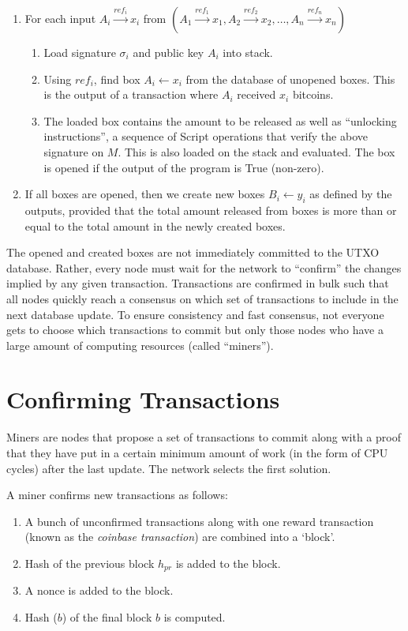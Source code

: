 \documentclass[]{report}   %
\newcommand{\sr}{\stackrel}
\newcommand{\ra}{\rightarrow}
\newcommand{\la}{\leftarrow}
\begin{document}
\begin{enumerate}
  \item	For each input $A_i\sr{ref_i}{\ra}x_i$ from $(A_1\sr{ref_1}{\ra}x_1, A_2\sr{ref_2}{\ra}x_2, \ldots, A_n\sr{ref_n}{\ra}x_n)$
	
	\begin{enumerate}
		\item Load signature $\sigma_i$ and public key $A_i$ into stack. 
		\item Using $ref_i$, find box $A_{i}\la x_i$ from the database of unopened boxes. This is the output of a transaction where $A_i$ received $x_i$ bitcoins. 
		\item The loaded box contains the amount to be released as well as ``unlocking instructions'', a sequence of Script operations that verify the above signature on $M$. This is also loaded on the stack and evaluated. The box is opened if the output of the program is True (non-zero).
	\end{enumerate}
	\item If all boxes are opened, then we create new boxes $B_i\la y_i$ as defined by the outputs, provided that the total amount released from boxes is more than or equal to the total amount in the newly created boxes. 
\end{enumerate}

The opened and created boxes are not immediately committed to the UTXO database. Rather, every node must wait for the network to ``confirm'' the changes implied by any given transaction.  
Transactions are confirmed in bulk such that all nodes quickly reach a consensus on which set of transactions to include in the next database update. 
To ensure consistency and fast consensus, not everyone gets to choose which transactions to commit but only those nodes who have a large amount of computing resources (called ``miners'').

 
\section{Confirming Transactions}
\label{sec:verify}
Miners are nodes that propose a set of transactions to commit along with a proof that they have put in a certain minimum amount of work (in the form of CPU cycles) after the last update. The network selects the first solution. 

A miner confirms new transactions as follows: 
\begin{enumerate}
	\item A bunch of unconfirmed transactions along with one reward transaction %
	(known as the \emph{coinbase transaction}) are combined into a `block'.
	\item Hash of the previous block $h_{pr}$ is added to the block. %
	\item A nonce is added to the block.
	\item Hash%
	($b$) %
	 of the final block $b$ is computed. 	
\end{enumerate}
\end{document}
